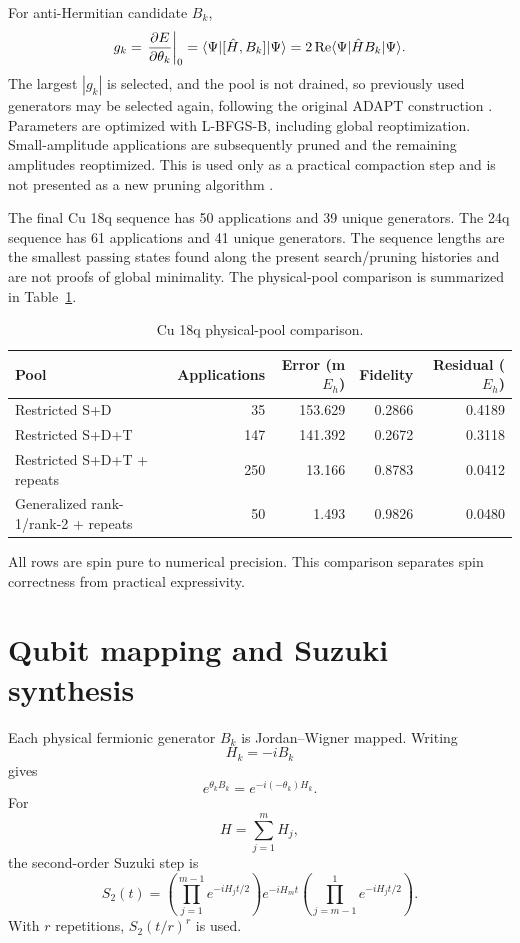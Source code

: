 \documentclass[
 aip,
 jcp,
 amsmath,amssymb,
 preprint
]{revtex4-2}
\begin{document}
For anti-Hermitian candidate $B_k$,
\begin{equation}
g_k
=
\left.\frac{\partial E}{\partial\theta_k}\right|_0
=
\langle\Psi|[\hat H,B_k]|\Psi\rangle
=
2\,{\rm Re}\langle\Psi|\hat H B_k|\Psi\rangle.
\end{equation}
The largest $|g_k|$ is selected, and the pool is not drained, so previously used generators may be selected again, following the original ADAPT construction \cite{grimsley2019adapt}.
Parameters are optimized with L-BFGS-B, including global reoptimization.
Small-amplitude applications are subsequently pruned and the remaining amplitudes reoptimized. This is used only as a practical compaction step and is not presented as a new pruning algorithm \cite{vaquero2025pruned}.

The final Cu 18q sequence has 50 applications and 39 unique generators.
The 24q sequence has 61 applications and 41 unique generators.
The sequence lengths are the smallest passing states found along the present search/pruning histories and are not proofs of global minimality.
The physical-pool comparison is summarized in Table~\ref{tab:poolcomparison}.

\begin{table}[htbp]
\centering
\small
\caption{Cu 18q physical-pool comparison.}
\label{tab:poolcomparison}
\begin{tabular}{lrrrr}
\toprule
Pool & Applications & Error (m$E_h$) & Fidelity & Residual ($E_h$)\\
\midrule
Restricted S+D & 35 & 153.629 & 0.2866 & 0.4189\\
Restricted S+D+T & 147 & 141.392 & 0.2672 & 0.3118\\
Restricted S+D+T + repeats & 250 & 13.166 & 0.8783 & 0.0412\\
Generalized rank-1/rank-2 + repeats & 50 & 1.493 & 0.9826 & 0.0480\\
\bottomrule
\end{tabular}
\end{table}

All rows are spin pure to numerical precision.
This comparison separates spin correctness from practical expressivity.

\section{Qubit mapping and Suzuki synthesis}

Each physical fermionic generator $B_k$ is Jordan--Wigner mapped.
Writing
\begin{equation}
H_k=-iB_k
\end{equation}
gives
\begin{equation}
e^{\theta_kB_k}=e^{-i(-\theta_k)H_k}.
\end{equation}
For
\begin{equation}
H=\sum_{j=1}^{m}H_j,
\end{equation}
the second-order Suzuki step is
\begin{equation}
S_2(t)=
\left(\prod_{j=1}^{m-1}e^{-iH_jt/2}\right)
e^{-iH_mt}
\left(\prod_{j=m-1}^{1}e^{-iH_jt/2}\right).
\end{equation}
With $r$ repetitions, $S_2(t/r)^r$ is used.
\end{document}
